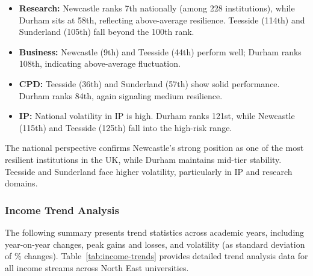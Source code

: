 \documentclass[journal,onecolumn, 10pt,draftclsnofoot]{IEEEtran}
\begin{document}
\begin{itemize}
    \item \textbf{Research:} Newcastle ranks 7th nationally (among 228 institutions), while Durham sits at 58th, reflecting above-average resilience. Teesside (114th) and Sunderland (105th) fall beyond the 100th rank.
    
    \item \textbf{Business:} Newcastle (9th) and Teesside (44th) perform well; Durham ranks 108th, indicating above-average fluctuation.
    
    \item \textbf{CPD:} Teesside (36th) and Sunderland (57th) show solid performance. Durham ranks 84th, again signaling medium resilience.
    
    \item \textbf{IP:} National volatility in IP is high. Durham ranks 121st, while Newcastle (115th) and Teesside (125th) fall into the high-risk range.
\end{itemize}

The national perspective confirms Newcastle's strong position as one of the most resilient institutions in the UK, while Durham maintains mid-tier stability. Teesside and Sunderland face higher volatility, particularly in IP and research domains.

\subsubsection{Income Trend Analysis}

The following summary presents trend statistics across academic years, including year-on-year changes, peak gains and losses, and volatility (as standard deviation of \% changes). Table~\ref{tab:income-trends} provides detailed trend analysis data for all income streams across North East universities.
\end{document}
